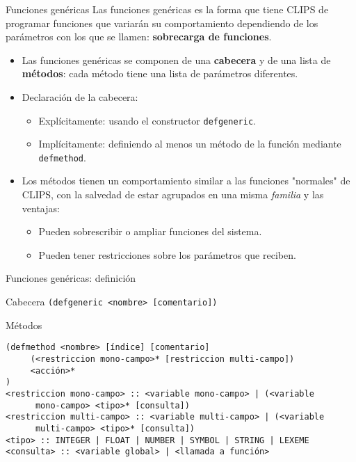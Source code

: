 \documentclass[usenames,dvipsnames,aspectratio=169]{beamer}
\begin{document}
\begin{frame}{Funciones genéricas}
	Las funciones genéricas es la forma que tiene CLIPS de programar funciones que variarán su comportamiento dependiendo de los parámetros con los que se llamen: \textbf{sobrecarga de funciones}.
	\begin{itemize}
		\item Las funciones genéricas se componen de una \textbf{cabecera} y de una lista de \textbf{métodos}: cada método tiene una lista de parámetros diferentes.
		\item Declaración de la cabecera:
		\begin{itemize}
			\item Explícitamente: usando el constructor \texttt{defgeneric}.
			\item Implícitamente: definiendo al menos un método de la función mediante \texttt{defmethod}.
		\end{itemize}
		\item Los métodos tienen un comportamiento similar a las funciones "normales" de CLIPS, con la salvedad de estar agrupados en una misma \textit{familia} y las ventajas:
		\begin{itemize}
			\item Pueden sobrescribir o ampliar funciones del sistema.
			\item Pueden tener restricciones sobre los parámetros que reciben.
		\end{itemize}
	\end{itemize}
\end{frame}

\begin{frame}[fragile]{Funciones genéricas: definición}
	\begin{block}{Cabecera}
		\texttt{(defgeneric <nombre> [comentario])}
	\end{block}
	\begin{block}{Métodos}
		\small
		\begin{verbatim}
(defmethod <nombre> [índice] [comentario]
     (<restriccion mono-campo>* [restriccion multi-campo])
     <acción>*
)
<restriccion mono-campo> :: <variable mono-campo> | (<variable
      mono-campo> <tipo>* [consulta])
<restriccion multi-campo> :: <variable multi-campo> | (<variable
      multi-campo> <tipo>* [consulta])
<tipo> :: INTEGER | FLOAT | NUMBER | SYMBOL | STRING | LEXEME
<consulta> :: <variable global> | <llamada a función>
		\end{verbatim}
	\end{block}
\end{frame}
\end{document}
